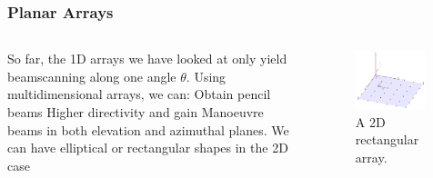 \documentclass[10pt]{beamer}
\begin{document}
\begin{frame}
        \frametitle{Planar Arrays}
        \begin{columns}[T]
            \begin{column}{.4\textwidth}
                \begin{outline}
                    \1 So far, the 1D arrays we have looked at only yield beamscanning along one angle $\theta$.
                    \1 Using multidimensional arrays, we can:
                    \2 Obtain pencil beams
                    \2 Higher directivity and gain
                    \2 Manoeuvre beams in both elevation and azimuthal planes.
                    \1 We can have elliptical or rectangular shapes in the 2D case
                \end{outline}
            \end{column}
            \begin{column}{.6\textwidth}
                \begin{figure}[h!]
                    \centering
                    \includegraphics[width=0.95\textwidth]{planar_array.pdf}
                    \caption{A 2D rectangular array.}
                \end{figure}
            \end{column}
        \end{columns}
\end{frame}
\end{document}
